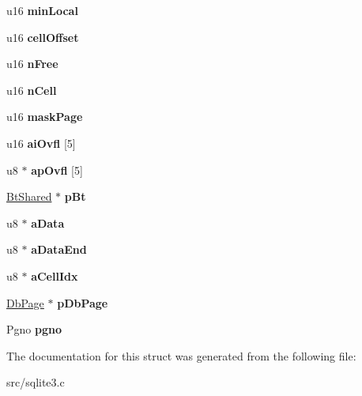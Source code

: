 \begin{DoxyCompactItemize}
\item 
\hypertarget{struct_mem_page_a95cab31aa57bf8b478be273557c5c807}{u16 {\bfseries min\-Local}}\label{struct_mem_page_a95cab31aa57bf8b478be273557c5c807}

\item 
\hypertarget{struct_mem_page_a324ed834d93c3ae72994fb5730940521}{u16 {\bfseries cell\-Offset}}\label{struct_mem_page_a324ed834d93c3ae72994fb5730940521}

\item 
\hypertarget{struct_mem_page_a3418a9aee707f57a73d8470f8a1228a8}{u16 {\bfseries n\-Free}}\label{struct_mem_page_a3418a9aee707f57a73d8470f8a1228a8}

\item 
\hypertarget{struct_mem_page_a35d1d8f836201b82b1eb778ce0e324f4}{u16 {\bfseries n\-Cell}}\label{struct_mem_page_a35d1d8f836201b82b1eb778ce0e324f4}

\item 
\hypertarget{struct_mem_page_aa3d64e8755cc9f431bbc8423a2b506ec}{u16 {\bfseries mask\-Page}}\label{struct_mem_page_aa3d64e8755cc9f431bbc8423a2b506ec}

\item 
\hypertarget{struct_mem_page_a857e00533053fe6017c6e08b1b240661}{u16 {\bfseries ai\-Ovfl} \mbox{[}5\mbox{]}}\label{struct_mem_page_a857e00533053fe6017c6e08b1b240661}

\item 
\hypertarget{struct_mem_page_a3a6347d06b1e85938605d9a44f193cb9}{u8 $\ast$ {\bfseries ap\-Ovfl} \mbox{[}5\mbox{]}}\label{struct_mem_page_a3a6347d06b1e85938605d9a44f193cb9}

\item 
\hypertarget{struct_mem_page_a949df1156f7392592eaeb64389068f99}{\hyperlink{struct_bt_shared}{Bt\-Shared} $\ast$ {\bfseries p\-Bt}}\label{struct_mem_page_a949df1156f7392592eaeb64389068f99}

\item 
\hypertarget{struct_mem_page_a2d873eff563d2208be0c24959140a4b0}{u8 $\ast$ {\bfseries a\-Data}}\label{struct_mem_page_a2d873eff563d2208be0c24959140a4b0}

\item 
\hypertarget{struct_mem_page_ab5d2ecb95a84eaf4bd0ccef536bac6d7}{u8 $\ast$ {\bfseries a\-Data\-End}}\label{struct_mem_page_ab5d2ecb95a84eaf4bd0ccef536bac6d7}

\item 
\hypertarget{struct_mem_page_a6f391f110e68ede6e5234b4e9f678f99}{u8 $\ast$ {\bfseries a\-Cell\-Idx}}\label{struct_mem_page_a6f391f110e68ede6e5234b4e9f678f99}

\item 
\hypertarget{struct_mem_page_add322c1aed91e95d8dfe3ac3535d65b4}{\hyperlink{struct_pg_hdr}{Db\-Page} $\ast$ {\bfseries p\-Db\-Page}}\label{struct_mem_page_add322c1aed91e95d8dfe3ac3535d65b4}

\item 
\hypertarget{struct_mem_page_ad2b0c532abc799bbcf3b43df4f0b0546}{Pgno {\bfseries pgno}}\label{struct_mem_page_ad2b0c532abc799bbcf3b43df4f0b0546}

\end{DoxyCompactItemize}


The documentation for this struct was generated from the following file\-:\begin{DoxyCompactItemize}
\item 
src/sqlite3.\-c\end{DoxyCompactItemize}
